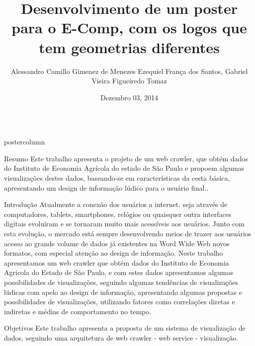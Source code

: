 \documentclass[final,hyperref={pdfpagelabels=false}]{beamer}
\title{\huge Desenvolvimento de um poster para o E-Comp, com os logos que tem geometrias diferentes}
\author{Alessandro Camillo Gimenez de Menezes\inst{1} Ezequiel França dos Santos\inst{1}, Gabriel Vieira Figueiredo Tomaz\inst{1}}
\institute[SENAC]{Centro Universitário Senac - Campus}
\date[Dezembro 3th, 2014]{Dezembro 03, 2014}
\newlength{\columnheight}
\begin{document}
\begin{frame}
  \begin{columns}%
\begin{column}{.49\textwidth}
      \begin{beamercolorbox}[center,wd=\textwidth]{postercolumn}
        \begin{minipage}[T]{.95\textwidth} %
          \parbox[t][\columnheight]{\textwidth}{ %
            
            \begin{block}{Resumo}
                 Este trabalho apresenta o projeto de um web crawler, que obtém dados do Instituto de Economia Agrícola do estado de São Paulo e propoem algumas visualizações destes dados, baseando-se em características da cesta básica, apresentando um design de informação lúdico para o usuário final..
            \end{block}
            \vfill
            \begin{block}{Introdução}
             Atualmente a conexão dos usuários a internet, seja através de computadores, tablets, smartphones, relógios ou quaisquer outra interfaces digitais evoluíram e se tornaram muito mais acessíveis aos usuários. Junto com esta evolução, o mercado está sempre desenvolvendo meios de trazer aos usuários acesso ao grande volume de dados já existentes na Word Wide Web novos formatos, com especial atenção ao design de informação. Neste trabalho apresentamos um web crawler que obtém dados do Instituto de Economia Agricola do Estado de São Paulo, e com estes dados apresentamos algumas possibilidades de visualizações, seguindo algumas tendências de visualizações lúdicas com apelo ao design de informação, apresentando algumas propostas e possibilidades de visualizações, utilizando fatores como correlações diretas e indiretas e médias de comportamento no tempo.              
            \end{block}
            \vfill
            \begin{block}{Objetivos}
             Este trabalho apresenta a proposta de um sistema de visualização de dados, seguindo uma arquitetura de web crawler - web service - visualização. 
             

\end{block}}
\end{minipage}
\end{beamercolorbox}
\end{column}
\end{columns}
\end{frame}
\end{document}
